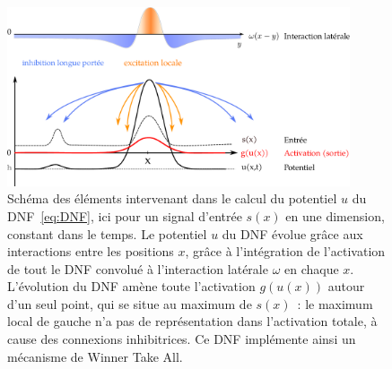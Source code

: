 \documentclass[../main]{subfiles}
\begin{document}
\begin{figure}
	\centering\includegraphics[width=0.9\textwidth]{DNF.pdf}
	\caption{Schéma des éléments intervenant dans le calcul du potentiel $u$ du DNF~\ref{eq:DNF}, ici pour un signal d'entrée $s(x)$ en une dimension, constant dans le temps.
	Le potentiel $u$ du DNF évolue grâce aux interactions entre les positions $x$, grâce à l'intégration de l'activation de tout le DNF convolué à l'interaction latérale $\omega$ en chaque $x$.
	L'évolution du DNF amène toute l'activation $g(u(x))$ autour d'un seul point, qui se situe au maximum de $s(x)$~: le maximum local de gauche n'a pas de représentation dans l'activation totale, à cause des connexions inhibitrices.
	Ce DNF implémente ainsi un mécanisme de Winner Take All. \label{fig:DNF}
	}
\end{figure}
\end{document}
